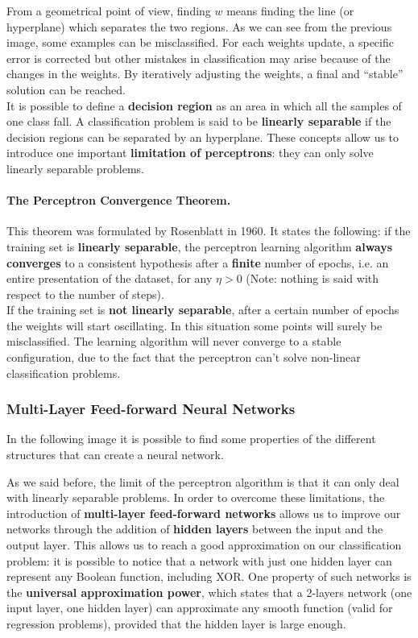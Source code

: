 
From a geometrical point of view, finding $w$ means finding the line (or hyperplane) which separates the two regions.
As we can see from the previous image, some examples can be misclassified. For each weights update, a specific error is corrected but other mistakes in classification may arise because of the changes in the weights. By iteratively adjusting the weights, a final and ``stable'' solution can be reached.\\
It is possible to define a \textbf{decision region} as an area in which all the samples of one class fall. A classification problem is said to be \textbf{linearly separable} if the decision regions can be separated by an hyperplane. These concepts allow us to introduce one important \textbf{limitation of perceptrons}: they can only solve linearly separable problems.

\paragraph*{The Perceptron Convergence Theorem.} This theorem was formulated by Rosenblatt in 1960. It states the following: if the training set is \textbf{linearly separable}, the perceptron learning algorithm \textbf{always converges} to a consistent hypothesis after a \textbf{finite} number of epochs, i.e. an entire presentation of the dataset, for any $\eta > 0$ (Note: nothing is said with respect to the number of steps).\\
If the training set is \textbf{not linearly separable}, after a certain number of epochs the weights will start oscillating. In this situation some points will surely be misclassified. The learning algorithm will never converge to a stable configuration, due to the fact that the perceptron can't solve non-linear classification problems.

\par \bigskip \noindent
\subsubsection{Multi-Layer Feed-forward Neural Networks}
In the following image it is possible to find some properties of the different structures that can create a neural network.


As we said before, the limit of the perceptron algorithm is that it can only deal with linearly separable problems. In order to overcome these limitations, the introduction of \textbf{multi-layer feed-forward networks} allows us to improve our networks through the addition of \textbf{hidden layers} between the input and the output layer. This allows us to reach a good approximation on our classification problem: it is possible to notice that a network with just one hidden layer can represent any Boolean function, including XOR. One property of such networks is the \textbf{universal approximation power}, which states that a 2-layers network (one input layer, one hidden layer) can approximate any smooth function (valid for regression problems), provided that the hidden layer is large enough.

